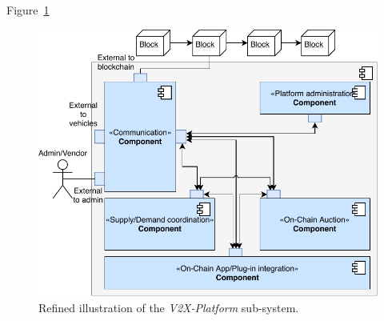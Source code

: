 \documentclass{llncs}
\begin{document}
{				Figure~\ref{fig:system-architecture--platform}
				
				\begin{figure}
					\centering
					\includegraphics[scale=0.75]{Figures/longterm-architecture/20180507_Refined-sys-architecture--V2X.pdf}
					\caption{Refined illustration of the \textit{V2X-Platform} sub-system.}	
					\label{fig:system-architecture--platform}
				\end{figure}						

%		
%		
%		
%		
%		



		
%			

}
\end{document}

